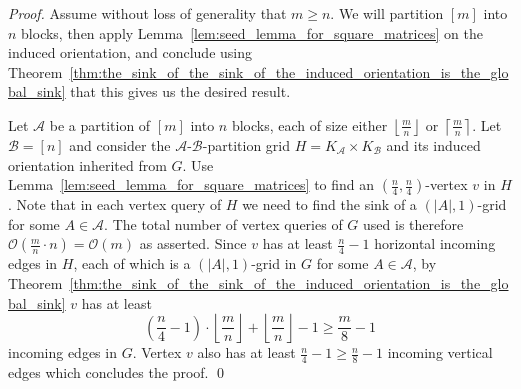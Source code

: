\documentclass[runningheads,a4paper]{llncs}
\newcommand{\A}{\ensuremath{\mathcal A}}
\newcommand{\B}{\ensuremath{\mathcal B}}
\begin{document}
\begin{proof}
 Assume without loss of generality that $m \geq n$. 
 We will partition $[m]$ into $n$ blocks, then apply Lemma~\ref{lem:seed_lemma_for_square_matrices} on the induced orientation, and conclude using Theorem~\ref{thm:the_sink_of_the_sink_of_the_induced_orientation_is_the_global_sink} that this  gives us the desired result.
 
  Let $\A$ be a partition of $[m]$ into $n$ blocks, each of size either $\left\lfloor \frac{m}{n} \right\rfloor$ or $\left\lceil \frac{m}{n} \right\rceil$. Let $\B = [n]$ and 
consider the $\A$-$\B$-partition grid $H = K_\A\times K_\B$ and its induced orientation inherited from $G$. 
 Use Lemma~\ref{lem:seed_lemma_for_square_matrices} to find an $(\frac{n}{4}, \frac{n}{4})$-vertex $v$ in $H$. 
 Note that in each vertex query of $H$ we need to find the sink of a $(|A|,1)$-grid for some $A\in \A$. 
 The total number of vertex queries of $G$ used is therefore $\mathcal{O}(\frac{m}{n}\cdot n) = \mathcal{O}(m)$ as asserted. 
 Since $v$ has at least $\frac{n}{4} - 1$ horizontal incoming edges in $H$, each of which is a $(|A|,1)$-grid in $G$ for some $A\in \A$, 
 by Theorem~\ref{thm:the_sink_of_the_sink_of_the_induced_orientation_is_the_global_sink} $v$ has at least $$\left(\frac{n}{4} - 1\right)\cdot\left\lfloor \frac{m}{n} \right\rfloor + \left\lfloor \frac{m}{n} \right\rfloor - 1 \geq \frac{m}{8} - 1$$ incoming edges in $G$.
 Vertex $v$ also has at least $\frac{n}{4} - 1 \geq \frac{n}{8} - 1$ incoming vertical edges which concludes the proof. \qed
\end{proof}


\end{document}
